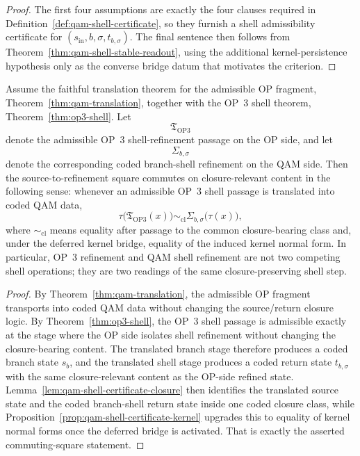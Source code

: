 \begin{proof}
The first four assumptions are exactly the four clauses required in Definition~\ref{def:qam-shell-certificate}, so they furnish a shell admissibility certificate for $(s_{\mathrm{in}},b,\sigma,t_{b,\sigma})$. The final sentence then follows from Theorem~\ref{thm:qam-shell-stable-readout}, using the additional kernel-persistence hypothesis only as the converse bridge datum that motivates the criterion.
\end{proof}

\begin{lemma}\label{lem:qam-op3-shell-commuting-square}
Assume the faithful translation theorem for the admissible OP fragment, Theorem~\ref{thm:qam-translation}, together with the OP~3 shell theorem, Theorem~\ref{thm:op3-shell}. Let
\[
\mathfrak T_{\mathrm{OP3}}
\]
denote the admissible OP~3 shell-refinement passage on the OP side, and let
\[
\Sigma_{b,\sigma}
\]
denote the corresponding coded branch-shell refinement on the QAM side. Then the source-to-refinement square commutes on closure-relevant content in the following sense: whenever an admissible OP~3 shell passage is translated into coded QAM data,
\[
\tau\bigl(\mathfrak T_{\mathrm{OP3}}(x)\bigr)
\sim_{\mathrm{cl}}
\Sigma_{b,\sigma}\bigl(\tau(x)\bigr),
\]
where $\sim_{\mathrm{cl}}$ means equality after passage to the common closure-bearing class and, under the deferred kernel bridge, equality of the induced kernel normal form. In particular, OP~3 refinement and QAM shell refinement are not two competing shell operations; they are two readings of the same closure-preserving shell step.
\end{lemma}

\begin{proof}
By Theorem~\ref{thm:qam-translation}, the admissible OP fragment transports into coded QAM data without changing the source/return closure logic. By Theorem~\ref{thm:op3-shell}, the OP~3 shell passage is admissible exactly at the stage where the OP side isolates shell refinement without changing the closure-bearing content. The translated branch stage therefore produces a coded branch state $s_b$, and the translated shell stage produces a coded return state $t_{b,\sigma}$ with the same closure-relevant content as the OP-side refined state. Lemma~\ref{lem:qam-shell-certificate-closure} then identifies the translated source state and the coded branch-shell return state inside one coded closure class, while Proposition~\ref{prop:qam-shell-certificate-kernel} upgrades this to equality of kernel normal forms once the deferred bridge is activated. That is exactly the asserted commuting-square statement.
\end{proof}

